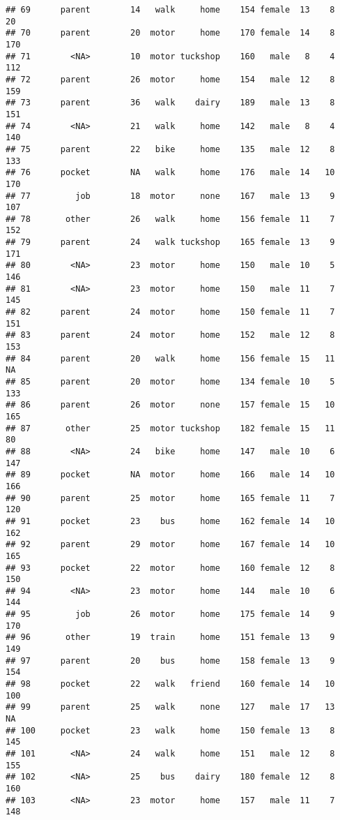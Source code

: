 \documentclass[
]{article}
\begin{document}
\begin{verbatim}
## 69      parent        14   walk     home    154 female  13    8      20
## 70      parent        20  motor     home    170 female  14    8     170
## 71        <NA>        10  motor tuckshop    160   male   8    4     112
## 72      parent        26  motor     home    154   male  12    8     159
## 73      parent        36   walk    dairy    189   male  13    8     151
## 74        <NA>        21   walk     home    142   male   8    4     140
## 75      parent        22   bike     home    135   male  12    8     133
## 76      pocket        NA   walk     home    176   male  14   10     170
## 77         job        18  motor     none    167   male  13    9     107
## 78       other        26   walk     home    156 female  11    7     152
## 79      parent        24   walk tuckshop    165 female  13    9     171
## 80        <NA>        23  motor     home    150   male  10    5     146
## 81        <NA>        23  motor     home    150   male  11    7     145
## 82      parent        24  motor     home    150 female  11    7     151
## 83      parent        24  motor     home    152   male  12    8     153
## 84      parent        20   walk     home    156 female  15   11      NA
## 85      parent        20  motor     home    134 female  10    5     133
## 86      parent        26  motor     none    157 female  15   10     165
## 87       other        25  motor tuckshop    182 female  15   11      80
## 88        <NA>        24   bike     home    147   male  10    6     147
## 89      pocket        NA  motor     home    166   male  14   10     166
## 90      parent        25  motor     home    165 female  11    7     120
## 91      pocket        23    bus     home    162 female  14   10     162
## 92      parent        29  motor     home    167 female  14   10     165
## 93      pocket        22  motor     home    160 female  12    8     150
## 94        <NA>        23  motor     home    144   male  10    6     144
## 95         job        26  motor     home    175 female  14    9     170
## 96       other        19  train     home    151 female  13    9     149
## 97      parent        20    bus     home    158 female  13    9     154
## 98      pocket        22   walk   friend    160 female  14   10     100
## 99      parent        25   walk     none    127   male  17   13      NA
## 100     pocket        23   walk     home    150 female  13    8     145
## 101       <NA>        24   walk     home    151   male  12    8     155
## 102       <NA>        25    bus    dairy    180 female  12    8     160
## 103       <NA>        23  motor     home    157   male  11    7     148

\end{verbatim}
\end{document}
